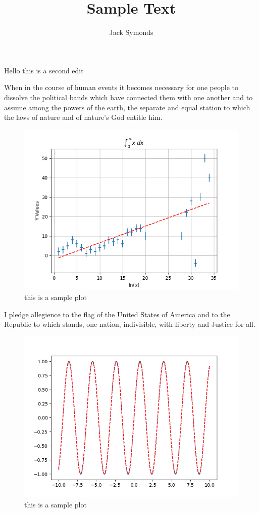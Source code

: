 \documentclass[twocolumn]{article}
\title{Sample Text}
\author{Jack Symonds}
\begin{document}
\maketitle

Hello this is a second edit

When in the course of human events it becomes necessary for one people to dissolve the political bands which have connected them with one another and to assume among the powers of the earth, the separate and equal station to which the laws of nature and of nature's God entitle him. 

\begin{figure}[h]
\caption{this is a sample plot}
\includegraphics[width=\linewidth]{plot}
\end{figure}



I pledge allegience to the flag of the United States of America and to the Republic to which stands, one nation, indivisible, with liberty and Justice for all. 

\begin{figure}[h]
\caption{this is a sample plot}
\includegraphics[width=\linewidth]{plot2}
\end{figure}

\blindtext[2]
\end{document}
